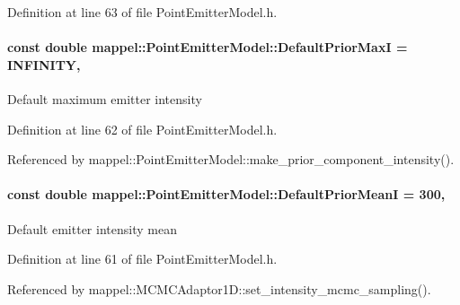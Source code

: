 Definition at line 63 of file Point\+Emitter\+Model.\+h.

\paragraph[{\texorpdfstring{Default\+Prior\+MaxI}{DefaultPriorMaxI}}]{\setlength{\rightskip}{0pt plus 5cm}const double mappel\+::\+Point\+Emitter\+Model\+::\+Default\+Prior\+MaxI = I\+N\+F\+I\+N\+I\+TY\hspace{0.3cm}{\ttfamily [static]}, {\ttfamily [inherited]}}\hypertarget{classmappel_1_1PointEmitterModel_a4ad3422744bdac162e905d5615bf5b66}{}\label{classmappel_1_1PointEmitterModel_a4ad3422744bdac162e905d5615bf5b66}
Default maximum emitter intensity 

Definition at line 62 of file Point\+Emitter\+Model.\+h.



Referenced by mappel\+::\+Point\+Emitter\+Model\+::make\+\_\+prior\+\_\+component\+\_\+intensity().

\paragraph[{\texorpdfstring{Default\+Prior\+MeanI}{DefaultPriorMeanI}}]{\setlength{\rightskip}{0pt plus 5cm}const double mappel\+::\+Point\+Emitter\+Model\+::\+Default\+Prior\+MeanI = 300\hspace{0.3cm}{\ttfamily [static]}, {\ttfamily [inherited]}}\hypertarget{classmappel_1_1PointEmitterModel_a607fcdea787b0cc3c6ac8804d378d1b1}{}\label{classmappel_1_1PointEmitterModel_a607fcdea787b0cc3c6ac8804d378d1b1}
Default emitter intensity mean 

Definition at line 61 of file Point\+Emitter\+Model.\+h.



Referenced by mappel\+::\+M\+C\+M\+C\+Adaptor1\+D\+::set\+\_\+intensity\+\_\+mcmc\+\_\+sampling().

